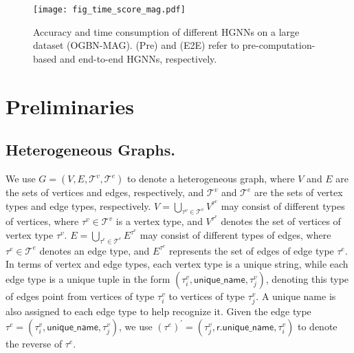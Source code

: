 \documentclass[lettersize,journal]{IEEEtran}
\begin{document}
\begin{figure}[!tp]
\centering\texttt{[image: fig\_time\_score\_mag.pdf]}
\vspace{-3mm}
\caption{
Accuracy and time consumption of different HGNNs on a large dataset (OGBN-MAG).
(Pre) and (E2E) refer to pre-computation-based and end-to-end HGNNs, respectively.
}
 \label{fig:intro}
 \vspace{-4mm}
\end{figure}






\section{Preliminaries}



\subsection{Heterogeneous Graphs.} 




We use $G = (V, E, \mathcal{T}^{v}, \mathcal{T}^{e})$ to denote a heterogeneous graph, where $V$ and $E$ are the sets of vertices and edges, respectively, and $\mathcal{T}^{v}$ and $\mathcal{T}^{e}$ are the sets of vertex types and edge types, respectively.
$V=\bigcup\limits_{\tau^{v} \in \mathcal{T}^{v}} V^{\tau^{v}}$ may consist of different types of vertices, where $\tau^{v} \in \mathcal{T}^{v}$ is a vertex type, and $V^{\tau^{v}}$ denotes the set of vertices of vertex type $\tau^{v}$.
$E=\bigcup\limits_{\tau^{e} \in \mathcal{T}^{e}} E^{\tau^{e}}$ may consist of different types of edges, where $\tau^{e} \in \mathcal{T}^{e}$ denotes an edge type, and $E^{\tau^{e}}$ represents the set of edges of edge type $\tau^{e}$.
In terms of vertex and edge types, each vertex type is a unique string, while each edge type is a unique tuple in the form $(\tau^{v}_i, \mathsf{unique\_name}, \tau^{v}_j)$, denoting this type of edges point from vertices of type $\tau^{v}_i$ to vertices of type $\tau^{v}_j$.
A unique name is also assigned to each edge type to help recognize it.
Given the edge type $\tau^{e} = (\tau^{v}_i, \mathsf{unique\_name}, \tau^{v}_j)$, we use $(\tau^{e})^{\prime} = (\tau^{v}_j, \mathsf{r.unique\_name}, \tau^{v}_i)$ to denote the reverse of $\tau^{e}$.
\end{document}
